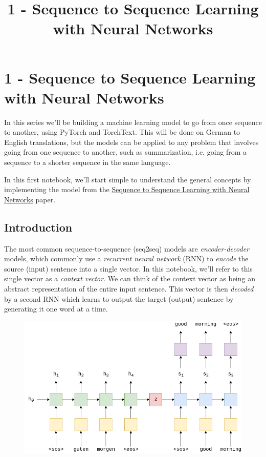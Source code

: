 \documentclass[11pt]{article}
\title{1 - Sequence to Sequence Learning with Neural Networks}
\makeatletter
\def\maxwidth{\ifdim\Gin@nat@width>\linewidth\linewidth
    \else\Gin@nat@width\fi}
\let\Oldincludegraphics\includegraphics
\renewcommand{\includegraphics}[1]{\Oldincludegraphics[width=.8\maxwidth]{#1}}
\makeatother
\begin{document}
    
    
    \maketitle
    
    

    
    \section{1 - Sequence to Sequence Learning with Neural
Networks}\label{sequence-to-sequence-learning-with-neural-networks}

In this series we'll be building a machine learning model to go from
once sequence to another, using PyTorch and TorchText. This will be done
on German to English translations, but the models can be applied to any
problem that involves going from one sequence to another, such as
summarization, i.e. going from a sequence to a shorter sequence in the
same language.

In this first notebook, we'll start simple to understand the general
concepts by implementing the model from the
\href{https://arxiv.org/abs/1409.3215}{Sequence to Sequence Learning
with Neural Networks} paper.

\subsection{Introduction}\label{introduction}

The most common sequence-to-sequence (seq2seq) models are
\emph{encoder-decoder} models, which commonly use a \emph{recurrent
neural network} (RNN) to \emph{encode} the source (input) sentence into
a single vector. In this notebook, we'll refer to this single vector as
a \emph{context vector}. We can think of the context vector as being an
abstract representation of the entire input sentence. This vector is
then \emph{decoded} by a second RNN which learns to output the target
(output) sentence by generating it one word at a time.

\begin{figure}
\centering
\includegraphics{assets/seq2seq1.png}
\caption{}
\end{figure}
\end{document}

